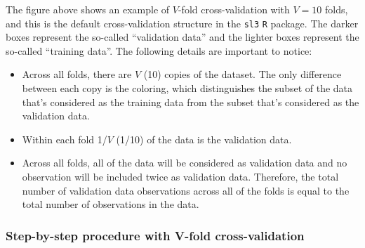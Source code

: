 \documentclass[
  12pt, krantz2,
]{book}
\newcommand{\passthrough}[1]{#1}
\providecommand{\tightlist}{%
  \setlength{\itemsep}{0pt}\setlength{\parskip}{0pt}}
\theoremstyle{definition}
\theoremstyle{definition}
\theoremstyle{definition}
\newcommand{\1}{\mathbbm{1}}
\begin{document}
The figure above shows an example of \(V\)-fold cross-validation with \(V=10\)
folds, and this is the default cross-validation structure in the \passthrough{\lstinline!sl3!} \passthrough{\lstinline!R!}
package. The darker boxes represent the so-called ``validation data'' and the
lighter boxes represent the so-called ``training data''. The following details
are important to notice:

\begin{itemize}
\tightlist
\item
  Across all folds, there are \(V\) (10) copies of the dataset. The only
  difference between each copy is the coloring, which distinguishes the subset
  of the data that's considered as the training data from the subset that's
  considered as the validation data.
\item
  Within each fold 1/\(V\) (1/10) of the data is the validation data.
\item
  Across all folds, all of the data will be considered as validation data and
  no observation will be included twice as validation data. Therefore, the
  total number of validation data observations across all of the folds is
  equal to the total number of observations in the data.
\end{itemize}

\hypertarget{step-by-step-procedure-with-v-fold-cross-validation}{%
\subsubsection{Step-by-step procedure with V-fold cross-validation}\label{step-by-step-procedure-with-v-fold-cross-validation}}
\end{document}
